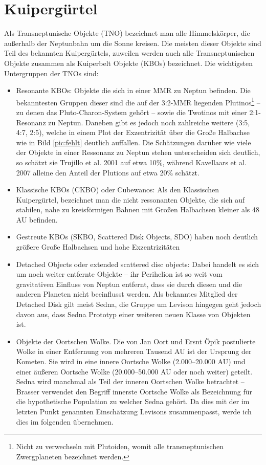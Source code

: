 \documentclass[10pt,a4paper,twoside]{article}
\begin{document}
\section{Kuipergürtel}\label{Kuiper}
Als Transneptunische Objekte (TNO) bezeichnet man alle Himmelskörper, die außerhalb der Neptunbahn um die Sonne kreisen. Die meisten dieser Objekte sind Teil des bekannten Kuipergürtels, zuweilen werden auch alle Transneptunischen Objekte zusammen als Kuiperbelt Objekte (KBOs) bezeichnet.
Die wichtigsten Untergruppen der TNOs sind:
\begin{itemize}
\item Resonante KBOs: Objekte die sich in einer MMR zu Neptun befinden. Die bekanntesten Gruppen dieser sind die auf der 3:2-MMR liegenden Plutinos\footnote{Nicht zu verwechseln mit Plutoiden, womit alle transneptunischen Zwergplaneten bezeichnet werden.} -- zu denen das Pluto-Charon-System gehört -- sowie die Twotinos mit einer 2:1-Resonanz zu Neptun. Daneben gibt es jedoch noch zahlreiche weitere (3:5, 4:7, 2:5), welche in einem Plot der Exzentrizität über die Große Halbachse wie in Bild \ref{pic:fehlt} deutlich auffallen.\cite{Levison2008} %
Die Schätzungen darüber wie viele der Objekte in einer Ressonanz zu Neptun stehen unterscheiden sich deutlich, %
so schätzt sie Trujillo et al. 2001 auf etwa 10\%, während Kavellaars et al. 2007 alleine den Anteil der Plutions auf etwa 20\% schätzt.\cite{Levison2008}
\item Klassische KBOs (CKBO) oder Cubewanos: Als den Klassischen Kuipergürtel, bezeichnet man die nicht ressonanten Objekte, die sich auf stabilen, nahe zu kreisförmigen Bahnen mit Großen Halbachsen kleiner als 48 AU befinden.
\item Gestreute KBOs (SKBO, Scattered Disk Objects, SDO) haben noch deutlich größere Große Halbachsen und hohe Exzentrizitäten %
\item Detached Objects oder extended scattered disc objects: Dabei handelt es sich um noch weiter entfernte Objekte -- ihr Perihelion ist so weit vom gravitativen Einfluss von Neptun entfernt, dass sie durch diesen und die anderen Planeten nicht beeinflusst werden. Als bekanntes Mitglied der Detached Disk gilt meist Sedna, die Gruppe um Levison hingegen geht jedoch davon aus, dass Sedna Prototyp einer weiteren neuen Klasse von Objekten ist.\cite{Levison2008} %
\item Objekte der Oortschen Wolke. Die von Jan Oort und Ersnt Öpik postulierte Wolke in einer Entfernung von mehreren Tausend AU ist der Ursprung der Kometen. Sie wird in eine innere Oortsche  Wolke (2.000–20.000 AU) und einer äußeren Oortsche Wolke (20.000–50.000 AU oder noch weiter) geteilt. Sedna wird manchmal als Teil der inneren Oortschen Wolke betrachtet – Brasser verwendet den Begriff innerste Oortsche Wolke als Bezeichnung für die hypothetische Population zu welcher Sedna gehört\cite{Brasser2008}. Da dies mit der im letzten Punkt genannten Einschätzung Levisons zusammenpasst, werde ich dies im folgenden übernehmen. %
\end{itemize} %
\end{document}
